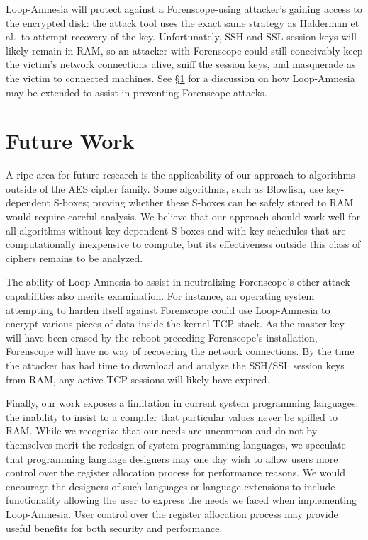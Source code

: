 \documentclass[letterpaper,twocolumn,nonatbib,10pt]{article}
\begin{document}
Loop-Amnesia will protect against a Forenscope-using attacker's
gaining access to the encrypted disk: the attack tool uses the exact
same strategy as Halderman et al.\ to attempt recovery of the key.
Unfortunately, SSH and SSL session keys will likely remain in RAM, so
an attacker with Forenscope could still conceivably keep the victim's
network connections alive, sniff the session keys, and masquerade as
the victim to connected machines.  See \S\ref{thefuture} for a
discussion on how Loop-Amnesia may be extended to assist in preventing
Forenscope attacks.

\section{Future Work}
\label{thefuture}

A ripe area for future research is the applicability of our approach
to algorithms outside of the AES cipher family.  Some algorithms, such
as Blowfish\cite{blowfish}, use key-dependent S-boxes; proving whether
these S-boxes can be safely stored to RAM would require careful
analysis.  We believe that our approach should work well for all
algorithms without key-dependent S-boxes and with key schedules that
are computationally inexpensive to compute, but its effectiveness
outside this class of ciphers remains to be analyzed.

The ability of Loop-Amnesia to assist in neutralizing Forenscope's
other attack capabilities also merits examination.  For instance, an
operating system attempting to harden itself against Forenscope could
use Loop-Amnesia to encrypt various pieces of data inside the kernel
TCP stack.  As the master key will have been erased by the reboot
preceding Forenscope's installation, Forenscope will have no way of
recovering the network connections.  By the time the attacker has had
time to download and analyze the SSH/SSL session keys from RAM, any
active TCP sessions will likely have expired.

Finally, our work exposes a limitation in current system programming
languages: the inability to insist to a compiler that particular
values never be spilled to RAM.  While we recognize that our needs are
uncommon and do not by themselves merit the redesign of system
programming languages, we speculate that programming language
designers may one day wish to allow users more control over the
register allocation process for performance reasons.  We would
encourage the designers of such languages or language extensions to
include functionality allowing the user to express the needs we faced
when implementing Loop-Amnesia.  User control over the register
allocation process may provide useful benefits for both security and
performance.
\end{document}
